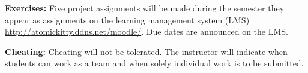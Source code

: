 \documentclass[12pt]{article}
\begin{document}
\textbf{Exercises:} 
Five project assignments will be made during the semester they appear as assignments on the learning management system (LMS) \url{http://atomickitty.ddns.net/moodle/}.  
Due dates are announced on the LMS.


\textbf{Cheating:} Cheating will not be tolerated.  The instructor will indicate when students can work as a team and when solely individual work is to be submitted.
\end{document}
